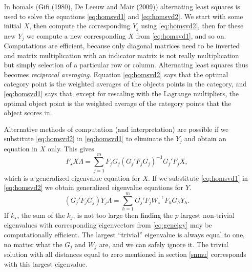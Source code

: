 \documentclass[
  12pt,
]{article}
\begin{document}
In homals (Gifi (1980), De Leeuw and Mair (2009)) alternating least squares is used
to solve the equations \eqref{eq:homsvd1} and \eqref{eq:homsvd2}. We start with
some initial \(X\), then compute the corresponding \(Y_j\) using \eqref{eq:homsvd2},
then for these new \(Y_j\) we compute a new corresponding \(X\) from \eqref{eq:homsvd1},
and so on. Computations are efficient, because only diagonal matrices need to
be inverted and matrix multiplication with an indicator matrix is not really multiplication but simply selection of a particular row or column. Alternating least squares thus becomes \emph{reciprocal averaging}. Equation \eqref{eq:homsvd2} says that the optimal category
point is the weighted averages of the objects points in the category, and \eqref{eq:homsvd1}
says that, except for rescaling with the Lagrange multipliers, the optimal object
point is the weighted average of the category points that the object scores in.

Alternative methods of computation (and interpretation) are possible if we
substitute \eqref{eq:homsvd2} in \eqref{eq:homsvd1} to eliminate the \(Y_j\)
and obtain an equation in \(X\) only. This gives
\begin{equation}
F_\star X\Lambda=\sum_{j=1}^m F_jG_j(G_j'F_jG_j)^{-1}G_j'F_jX,
\label{eq:geneigx}
\end{equation}
which is a generalized eigenvalue equation for \(X\). If we substitute \eqref{eq:homsvd1}
in \eqref{eq:homsvd2} we obtain generalized eigenvalue equations for \(Y\).
\begin{equation}
(G_j'F_jG_j)Y_j\Lambda=\sum_{h=1}^m G_j'F_jW_\star^{-1}F_hG_hY_h.
\label{eq:geneigy}
\end{equation}
If \(k_\star\), the sum of the \(k_j\), is not too large then finding the \(p\) largest non-trivial eigenvalues with corresponding eigenvectors from \eqref{eq:geneigy} may be computationally efficient. The largest ``trivial'' eigenvalue is always equal to one, no matter what the \(G_j\) and \(W_j\) are, and we can safely ignore it. The trivial solution with all distances equal to zero mentioned in section \ref{snmu} corresponds with this largest eigenvalue.
\end{document}
